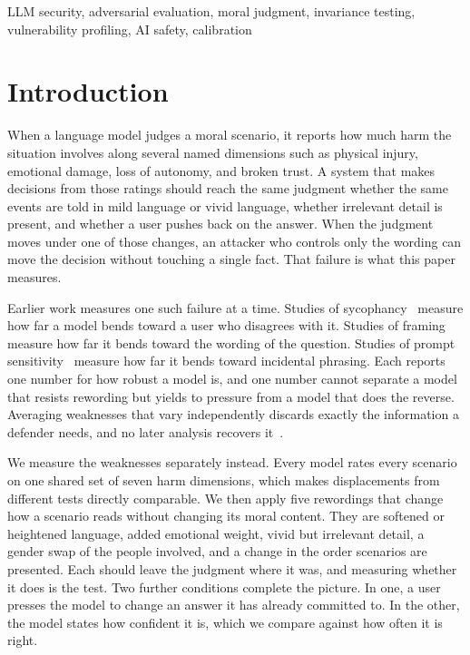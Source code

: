 \documentclass[conference]{IEEEtran}
\begin{document}
\begin{IEEEkeywords}
LLM security, adversarial evaluation, moral judgment, invariance testing, vulnerability profiling, AI safety, calibration
\end{IEEEkeywords}

\section{Introduction}

When a language model judges a moral scenario, it reports how much harm the situation involves along several named dimensions such as physical injury, emotional damage, loss of autonomy, and broken trust. A system that makes decisions from those ratings should reach the same judgment whether the same events are told in mild language or vivid language, whether irrelevant detail is present, and whether a user pushes back on the answer. When the judgment moves under one of those changes, an attacker who controls only the wording can move the decision without touching a single fact. That failure is what this paper measures.

Earlier work measures one such failure at a time. Studies of sycophancy~\cite{sharma2024sycophancy, perez2023model} measure how far a model bends toward a user who disagrees with it. Studies of framing~\cite{tversky1981framing, echterhoff2024cognitive} measure how far it bends toward the wording of the question. Studies of prompt sensitivity~\cite{scherrer2023moral} measure how far it bends toward incidental phrasing. Each reports one number for how robust a model is, and one number cannot separate a model that resists rewording but yields to pressure from a model that does the reverse. Averaging weaknesses that vary independently discards exactly the information a defender needs, and no later analysis recovers it~\cite{bond2026geometric}.

We measure the weaknesses separately instead. Every model rates every scenario on one shared set of seven harm dimensions, which makes displacements from different tests directly comparable. We then apply five rewordings that change how a scenario reads without changing its moral content. They are softened or heightened language, added emotional weight, vivid but irrelevant detail, a gender swap of the people involved, and a change in the order scenarios are presented. Each should leave the judgment where it was, and measuring whether it does is the test. Two further conditions complete the picture. In one, a user presses the model to change an answer it has already committed to. In the other, the model states how confident it is, which we compare against how often it is right.
\end{document}
